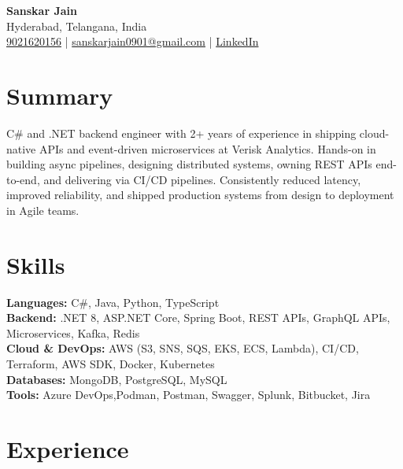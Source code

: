 \documentclass[a4paper,10pt]{article}
\begin{document}
\begin{center}
    {\LARGE \textbf{Sanskar Jain}} \\
    Hyderabad, Telangana, India \\
    \href{tel:9021620156}{9021620156} \;|\;
    \href{mailto:sanskarjain0901@gmail.com}{sanskarjain0901@gmail.com} \;|\;
    \href{https://www.linkedin.com/in/sanskar-jain0901/}{LinkedIn}
\end{center}

\vspace{3pt}

\section*{Summary}
C\# and .NET backend engineer with 2+ years of experience in shipping cloud-native APIs and event-driven microservices at Verisk Analytics.
Hands-on in building async pipelines, designing distributed systems, owning REST APIs end-to-end, and delivering via CI/CD pipelines.
Consistently reduced latency, improved reliability, and shipped production systems from design to deployment in Agile teams.

\section*{Skills}
\textbf{Languages:} C\#, Java, Python, TypeScript \\
\textbf{Backend:} .NET 8, ASP.NET Core, Spring Boot, REST APIs, GraphQL APIs, Microservices, Kafka, Redis \\
\textbf{Cloud \& DevOps:} AWS (S3, SNS, SQS, EKS, ECS, Lambda), CI/CD, Terraform, AWS SDK, Docker, Kubernetes \\
\textbf{Databases:} MongoDB, PostgreSQL, MySQL \\
\textbf{Tools:} Azure DevOps,Podman, Postman, Swagger, Splunk, Bitbucket, Jira

\section*{Experience}
\end{document}
